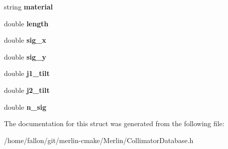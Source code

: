 \begin{DoxyCompactItemize}
string {\bfseries material}
\item 
\mbox{\label{structCollimatorDatabase_1_1FlukaData_afc873dfbac34b3415ca3deb2890eae01}} 
double {\bfseries length}
\item 
\mbox{\label{structCollimatorDatabase_1_1FlukaData_a760773a7fe5e3ab382fab08655fca632}} 
double {\bfseries sig\+\_\+x}
\item 
\mbox{\label{structCollimatorDatabase_1_1FlukaData_a77edb35c0a218a2c3a7ea8d4ca9d2b7d}} 
double {\bfseries sig\+\_\+y}
\item 
\mbox{\label{structCollimatorDatabase_1_1FlukaData_a552b1d356522ae1a89b061a51397110f}} 
double {\bfseries j1\+\_\+tilt}
\item 
\mbox{\label{structCollimatorDatabase_1_1FlukaData_a5081b4bf0abc8b600e654a41e8926573}} 
double {\bfseries j2\+\_\+tilt}
\item 
\mbox{\label{structCollimatorDatabase_1_1FlukaData_a7a8ed8745d5c4f05bb122a6b85c3f29b}} 
double {\bfseries n\+\_\+sig}
\end{DoxyCompactItemize}


The documentation for this struct was generated from the following file\+:\begin{DoxyCompactItemize}
\item 
/home/fallon/git/merlin-\/cmake/\+Merlin/Collimator\+Database.\+h\end{DoxyCompactItemize}
